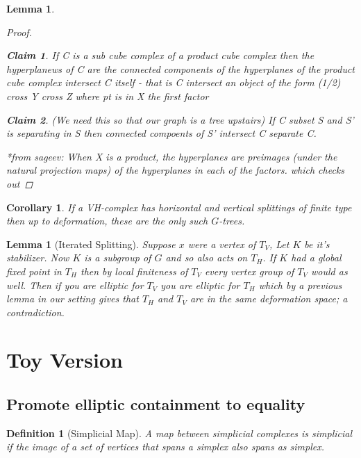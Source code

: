 \documentclass{article}
\theoremstyle{mystyle}
\newtheorem{lem}[thm]{Lemma}
\newtheorem{defn}[thm]{Definition}
\newtheorem*{cor*}{Corollary}
\newtheorem{claim}{Claim}
\theoremstyle{remark}
\begin{document}
\begin{lem}
\begin{proof}
        \begin{claim}
        If C is a sub cube complex of a product cube complex then the hyperplanews of C are the connected components of the hyperplanes of the product cube complex intersect C itself - that is C intersect an object of the form (1/2) cross Y cross Z where pt is in X the first factor
        \end{claim}
        
        \begin{claim}
        (We need this so that our graph is a tree upstairs)
        If C subset S and S' is separating in S then connected compoents of S' intersect C separate C.
        \end{claim}
        
        *from sageev: When X is a product, the hyperplanes are preimages (under the natural
projection maps) of the hyperplanes in each of the factors.
 which checks out

    \end{proof}
\end{lem}

\begin{cor*}
    If a VH-complex has horizontal and vertical splittings of finite type then up to deformation, these are the only such \(G\)-trees.
\end{cor*}


\begin{lem}
    [Iterated Splitting]
    \label{lem:iteratedsplitting} 
    Suppose \(x\) were a vertex of \(T_{V}\), Let \(K\) be it's stabilizer. Now \(K\) is a subgroup of \(G\) and so also acts on \(T_H\). If \(K\) had a global fixed point in \(T_H\)  then by local finiteness of \(T_V\) every vertex group of \(T_V\) would as well. Then if you are elliptic for \(T_V\) you are elliptic for \(T_H\) which by a previous lemma in our setting gives that \(T_H\) and \(T_V\) are in the same deformation space; a contradiction.
\end{lem}
\section{Toy Version}
\subsection{Promote elliptic containment to equality}



\begin{defn}
    [Simplicial Map]
    A map between simplicial complexes is simplicial if the image of a set of vertices that spans a simplex also spans as simplex.
\end{defn}
\end{document}
